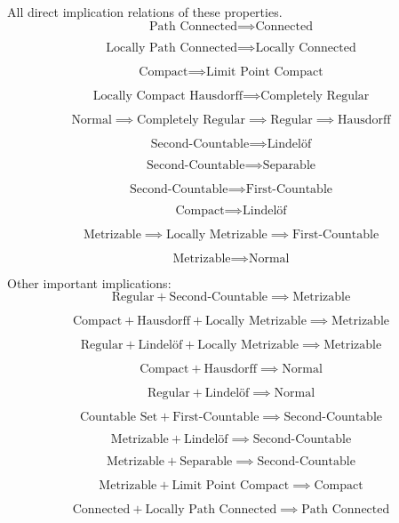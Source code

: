 \documentclass[12pt,a4paper]{article}
\begin{document}
    \begin{note}
        All direct implication relations of these properties.
        $$
        \text{Path Connected}\implies\text{Connected}
        $$

        $$
        \text{Locally Path Connected}\implies\text{Locally Connected}
        $$

        $$
        \text{Compact}\implies\text{Limit Point Compact}
        $$

        $$
        \text{Locally Compact Hausdorff}\implies\text{Completely Regular}
        $$

        $$
        \text{Normal}\implies\text{Completely Regular}\implies\text{Regular}\implies\text{Hausdorff}
        $$

        $$
        \text{Second-Countable}\implies\text{Lindel\"of}
        $$

        $$
        \text{Second-Countable}\implies\text{Separable}
        $$

        $$
        \text{Second-Countable}\implies\text{First-Countable}
        $$

        $$
        \text{Compact}\implies\text{Lindel\"of}
        $$
        
        $$
        \text{Metrizable}\implies\text{Locally Metrizable}\implies\text{First-Countable}
        $$

        $$
        \text{Metrizable}\implies\text{Normal}
        $$
    \end{note}

    \begin{note}
        Other important implications:
        $$
        \text{Regular} + \text{Second-Countable}\implies\text{Metrizable}
        $$

        $$
        \text{Compact} + \text{Hausdorff} + \text{Locally Metrizable}\implies \text{Metrizable}
        $$

        $$
        \text{Regular} + \text{Lindel\"of} + \text{Locally Metrizable}\implies \text{Metrizable}
        $$

        $$
        \text{Compact} + \text{Hausdorff}\implies\text{Normal}
        $$

        $$
        \text{Regular} + \text{Lindel\"of}\implies\text{Normal}
        $$
        
        $$
        \text{Countable Set} + \text{First-Countable}\implies\text{Second-Countable}
        $$

        $$
        \text{Metrizable} + \text{Lindel\"of}\implies\text{Second-Countable}
        $$

        $$
        \text{Metrizable} + \text{Separable}\implies\text{Second-Countable}
        $$

        $$
        \text{Metrizable} + \text{Limit Point Compact}\implies\text{Compact}
        $$
        
        $$
        \text{Connected} + \text{Locally Path Connected}\implies\text{Path Connected}
        $$
        
    \end{note}
    \hfill
\end{document}
